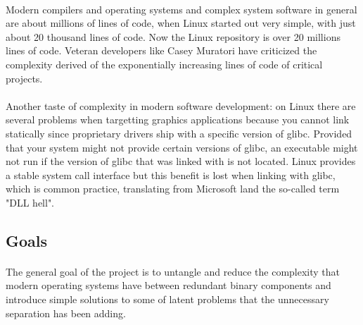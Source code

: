 \documentclass[12pt]{article}
\begin{document}
	\paragraph{}Modern compilers and operating systems and complex system software in general are about millions of lines of code, when Linux started out very simple, with just about 20 thousand lines of code. Now the Linux repository is over 20 millions lines of code. Veteran developers like Casey Muratori have criticized the complexity derived of the exponentially increasing lines of code of critical projects\cite{thirty-million}.
	\paragraph{}Another taste of complexity in modern software development: on Linux there are several problems when targetting graphics applications because you cannot link statically since proprietary drivers ship with a specific version of glibc. Provided that your system might not provide certain versions of glibc, an executable might not run if the version of glibc that was linked with is not located. Linux provides a stable system call interface but this benefit is lost when linking with glibc, which is common practice, translating from Microsoft land the so-called term "DLL hell".
	\subsection{Goals}
	\paragraph{}The general goal of the project is to untangle and reduce the complexity that modern operating systems have between redundant binary components and introduce simple solutions to some of latent problems that the unnecessary separation has been adding.	
\end{document}
